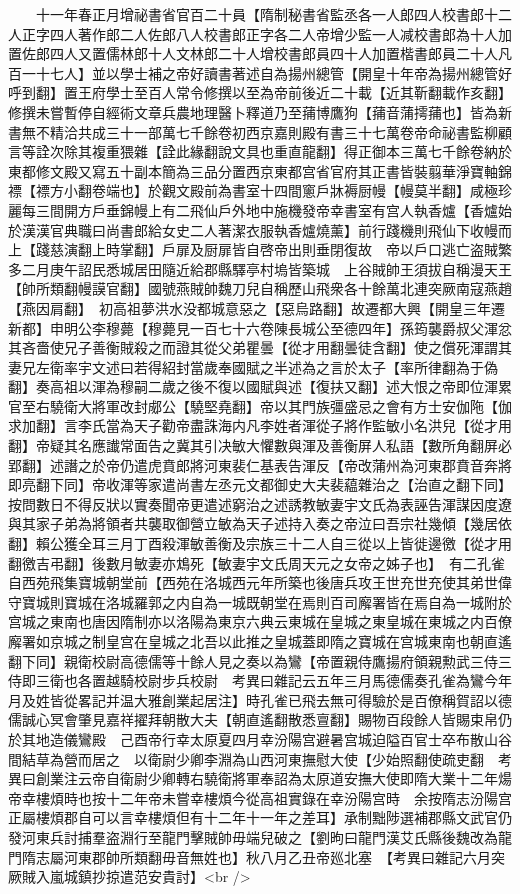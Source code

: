 　　十一年春正月增祕書省官百二十員【隋制秘書省監丞各一人郎四人校書郎十二人正字四人著作郎二人佐郎八人校書郎正字各二人帝增少監一人减校書郎為十人加置佐郎四人又置儒林郎十人文林郎二十人增校書郎員四十人加置楷書郎員二十人凡百一十七人】並以學士補之帝好讀書著述自為揚州總管【開皇十年帝為揚州總管好呼到翻】置王府學士至百人常令修撰以至為帝前後近二十載【近其靳翻載作亥翻】修撰未嘗暫停自經術文章兵農地理醫卜釋道乃至蒱博鷹狗【蒱音蒲摴蒱也】皆為新書無不精洽共成三十一部萬七千餘卷初西京嘉則殿有書三十七萬卷帝命祕書監柳顧言等詮次除其複重猥雜【詮此緣翻說文具也重直龍翻】得正御本三萬七千餘卷納於東都修文殿又寫五十副本簡為三品分置西京東都宫省官府其正書皆裝翦華淨寶軸錦褾【褾方小翻卷端也】於觀文殿前為書室十四間窻戶牀褥厨幔【幔莫半翻】咸極珍麗每三間開方戶垂錦幔上有二飛仙戶外地中施機發帝幸書室有宫人執香爐【香爐始於漢漢官典職曰尚書郎給女史二人著潔衣服執香爐燒薰】前行踐機則飛仙下收幔而上【踐慈演翻上時掌翻】戶扉及厨扉皆自啓帝出則垂閉復故　帝以戶口逃亡盗賊繁多二月庚午詔民悉城居田隨近給郡縣驛亭村塢皆築城　上谷賊帥王須拔自稱漫天王【帥所類翻幔謨官翻】國號燕賊帥魏刀兒自稱歷山飛衆各十餘萬北連突厥南寇燕趙【燕因肩翻】　初高祖夢洪水没都城意惡之【惡烏路翻】故遷都大興【開皇三年遷新都】申明公李穆薨【穆薨見一百七十六卷陳長城公至德四年】孫筠襲爵叔父渾忿其吝嗇使兄子善衡賊殺之而證其從父弟瞿曇【從才用翻曇徒含翻】使之償死渾謂其妻兄左衛率宇文述曰若得紹封當歲奉國賦之半述為之言於太子【率所律翻為于偽翻】奏高祖以渾為穆嗣二歲之後不復以國賦與述【復扶又翻】述大恨之帝即位渾累官至右驍衛大將軍改封郕公【驍堅堯翻】帝以其門族彊盛忌之會有方士安伽陁【伽求加翻】言李氏當為天子勸帝盡誅海内凡李姓者渾從子將作監敏小名洪兒【從才用翻】帝疑其名應䜟常面告之冀其引决敏大懼數與渾及善衡屏人私語【數所角翻屏必郢翻】述譖之於帝仍遣虎賁郎將河東裴仁基表告渾反【帝改蒲州為河東郡賁音奔將即亮翻下同】帝收渾等家遣尚書左丞元文都御史大夫裴藴雜治之【治直之翻下同】按問數日不得反狀以實奏聞帝更遣述窮治之述誘教敏妻宇文氏為表誣告渾謀因度遼與其家子弟為將領者共襲取御營立敏為天子述持入奏之帝泣曰吾宗社幾傾【幾居依翻】賴公獲全耳三月丁酉殺渾敏善衡及宗族三十二人自三從以上皆徙邊徼【從才用翻徼吉弔翻】後數月敏妻亦鴆死【敏妻宇文氏周天元之女帝之姊子也】　有二孔雀自西苑飛集寶城朝堂前【西苑在洛城西元年所築也後唐兵攻王世充世充使其弟世偉守寶城則寶城在洛城羅郭之内自為一城既朝堂在焉則百司廨署皆在焉自為一城附於宫城之東南也唐因隋制亦以洛陽為東京六典云東城在皇城之東皇城在東城之内百僚廨署如京城之制皇宫在皇城之北吾以此推之皇城蓋即隋之寶城在宫城東南也朝直遙翻下同】親衛校尉高德儒等十餘人見之奏以為鸞【帝置親侍鷹揚府領親勲武三侍三侍即三衛也各置越騎校尉步兵校尉　考異曰雜記云五年三月馬德儒奏孔雀為鸞今年月及姓皆從畧記并温大雅創業起居注】時孔雀已飛去無可得驗於是百僚稱賀詔以德儒誠心冥會肇見嘉祥擢拜朝散大夫【朝直遙翻散悉亶翻】賜物百段餘人皆賜束帛仍於其地造儀鸞殿　己酉帝行幸太原夏四月幸汾陽宫避暑宫城迫隘百官士卒布散山谷間結草為營而居之　以衛尉少卿李淵為山西河東撫慰大使【少始照翻使疏吏翻　考異曰創業注云帝自衛尉少卿轉右驍衛將軍奉詔為太原道安撫大使即隋大業十二年煬帝幸樓煩時也按十二年帝未嘗幸樓煩今從高祖實錄在幸汾陽宫時　余按隋志汾陽宫正屬樓煩郡自可以言幸樓煩但有十二年十一年之差耳】承制黜陟選補郡縣文武官仍發河東兵討捕羣盗淵行至龍門擊賊帥毋端兒破之【劉昫曰龍門漢艾氏縣後魏改為龍門隋志屬河東郡帥所類翻毋音無姓也】秋八月乙丑帝廵北塞　【考異曰雜記六月突厥賊入嵐城鎮抄掠遣范安貴討】<br />
